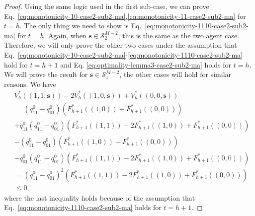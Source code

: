 \begin{proof}
Using the same logic used in the first sub-case, we can prove Eq.~\eqref{eq:monotonicity-10-case2-sub2-ma},\eqref{eq:monotonicity-11-case2-sub2-ma} for $t=h$. The only thing we need to show is Eq.~\eqref{eq:monotonicity-1110-case2-sub2-ma} for $t=h$. Again, when $\bm{s}\in\mathcal{S}_2^{M-2}$, this is the same as the two agent case. Therefore, we will only prove the other two cases under the assumption that Eq.~\eqref{eq:monotonicity-10-case2-sub2-ma}-\eqref{eq:monotonicity-1110-case2-sub2-ma} hold for $t=h+1$ and Eq. \eqref{eq:optimality-lemma3-case2-sub2-ma} holds for $t=h$. We will prove the result for $\bm{s}\in\mathcal{S}_1^{M-2}$, the other cases will hold for similar reasons. We have
\begin{align*}
    &V_h^*\left((1,1,\bm{s})\right)-2V_h^*((1,0,\bm{s}))+V_h^*((0,0,\bm{s}))\\&=\left(q^0_{11}-q^0_{01}\right)\left(F_{h+1}^*\left((1,0)\right)-F_{h+1}^*\left((0,0)\right)\right)\\
    &+q^0_{11}\left(q^0_{11}-q^0_{01}\right)\left(F_{h+1}^*\left((1,1)\right)-2F_{h+1}^*\left((1,0)\right)+F_{h+1}^*\left((0,0)\right)\right)\\
    &-\left(q^0_{11}-q^0_{01}\right)\left(F_{h+1}^*\left((1,0)\right)-F_{h+1}^*\left((0,0)\right)\right)\\
    &-q^0_{01}\left(q^0_{11}-q^0_{01}\right)\left(F_{h+1}^*\left((1,1)\right)-2F_{h+1}^*\left((1,0)\right)+F_{h+1}^*\left((0,0)\right)\right)\\
    &=\left(q^0_{11}-q^0_{01}\right)^2\left(F_{h+1}^*\left((1,1)\right)-2F_{h+1}^*\left((1,0)\right)+F_{h+1}^*\left((0,0)\right)\right)\\
    &\leq 0,
\end{align*}
where the last inequality holds because of the assumption that Eq.~\eqref{eq:monotonicity-1110-case2-sub2-ma} holds for $t=h+1$. 

\end{proof}
